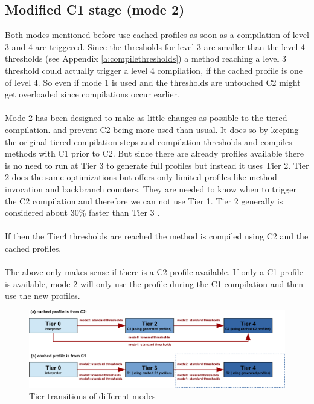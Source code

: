 \subsection{Modified C1 stage (mode 2)}
\label{s:mode2}
Both modes mentioned before use cached profiles as soon as a compilation of level 3 and 4 are triggered. Since the thresholds for level 3 are smaller than the level 4 thresholds (see Appendix \ref{a:compilethresholds}) a method reaching a level 3 threshold could actually trigger a level 4 compilation, if the cached profile is one of level 4. So even if mode 1 is used and the thresholds are untouched C2 might get overloaded since compilations occur earlier.
\\\\
Mode 2 has been designed to make as little changes as possible to the tiered compilation. and prevent C2 being more used than usual. It does so by keeping the original tiered compilation steps and compilation thresholds and compiles methods with C1 prior to C2. But since there are already profiles available there is no need to run at Tier 3 to generate full profiles but instead it uses Tier 2.
Tier 2 does the same optimizations but offers only limited profiles like method invocation and backbranch counters. They are needed to know when to trigger the C2 compilation and therefore we can not use Tier 1. Tier 2 generally is considered about 30\% faster than Tier 3 \cite{code_atp_hpp}.
\\\\
If then the Tier4 thresholds are reached the method is compiled using C2 and the cached profiles.
\\\\
The above only makes sense if there is a C2 profile available.
If only a C1 profile is available, mode 2 will only use the profile during the C1 compilation and then use the new profiles.

\begin{figure}[h]
  \begin{center}
    \centering
    \includegraphics{figures/hs_tiers_threshold.png}
    \caption{Tier transitions of different modes}
    \label{f:hs_tiers_thresholds}
  \end{center}
\end{figure}


